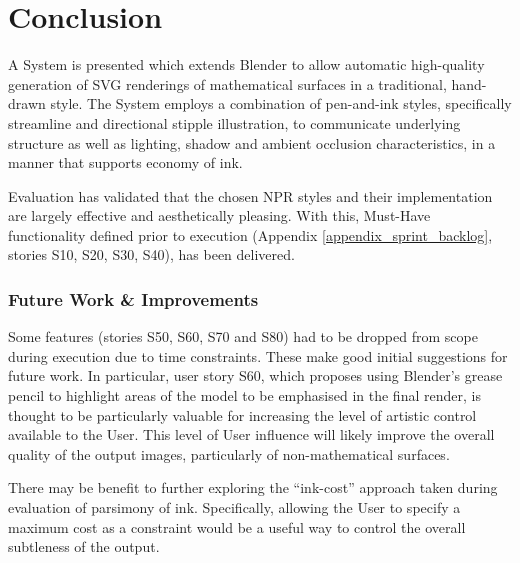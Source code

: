 

\chapter{Conclusion}\label{conclusion}

A System is presented which extends Blender to allow automatic high-quality generation of SVG renderings of mathematical surfaces in a traditional, hand-drawn style. The System employs a combination of pen-and-ink styles, specifically streamline and directional stipple illustration, to communicate underlying structure as well as lighting, shadow and ambient occlusion characteristics, in a manner that supports economy of ink.

Evaluation has validated that the chosen NPR styles and their implementation are largely effective and aesthetically pleasing. 
With this, Must-Have functionality defined prior to execution (Appendix \ref{appendix_sprint_backlog}, stories S10, S20, S30, S40), has been delivered.

\subsection{Future Work \& Improvements}

Some features (stories S50, S60, S70 and S80) had to be dropped from scope during execution due to time constraints. 
These make good initial suggestions for future work.
In particular, user story S60, which proposes using Blender's grease pencil to highlight areas of the model to be emphasised in the final render, is thought to be particularly valuable for increasing the level of artistic control available to the User.
This level of User influence will likely improve the overall quality of the output images, particularly of non-mathematical surfaces.

There may be benefit to further exploring the ``ink-cost'' approach taken during evaluation of parsimony of ink.
Specifically, allowing the User to specify a maximum cost as a constraint would be a useful way to control the overall subtleness of the output.

